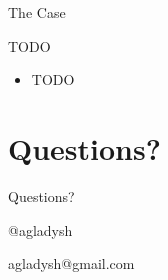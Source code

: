 \documentclass[aspectratio=43,handout,bigger]{beamer}
\begin{document}
\begin{frame}{The Case}
%
%
%
%
%
\end{frame}


\begin{frame}{TODO}
  \begin{itemize}
    \item TODO
  \end{itemize}
\end{frame}


\section{Questions?}

\begin{frame}[plain]{Questions?}

\begin{center}
\Huge{@agladysh}
\end{center}

\begin{center}
\Large{agladysh@gmail.com}
\end{center}

\end{frame}

\end{document}
